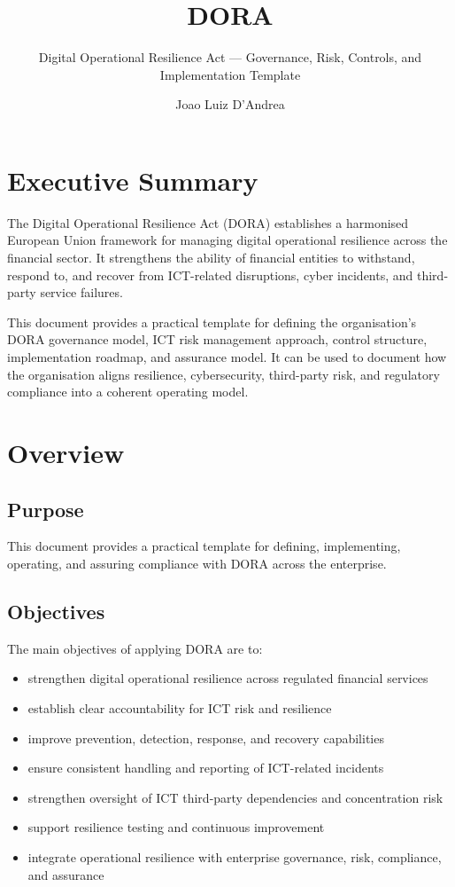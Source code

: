 \documentclass[
  letterpaper,
  DIV=11,
  numbers=noendperiod]{scrartcl}
\title{DORA}
\subtitle{Digital Operational Resilience Act --- Governance, Risk,
Controls, and Implementation Template}
\author{Joao Luiz D'Andrea}
\date{}
\providecommand{\tightlist}{%
  \setlength{\itemsep}{0pt}\setlength{\parskip}{0pt}}
\renewcommand*\contentsname{Table of contents}
\newcommand\contentsname{Table of contents}
\begin{document}
\maketitle

\renewcommand*\contentsname{Table of contents}
{
\hypersetup{linkcolor=}
\setcounter{tocdepth}{3}
\tableofcontents
}

\section{Executive Summary}\label{executive-summary}

The Digital Operational Resilience Act (DORA) establishes a harmonised
European Union framework for managing digital operational resilience
across the financial sector. It strengthens the ability of financial
entities to withstand, respond to, and recover from ICT-related
disruptions, cyber incidents, and third-party service failures.

This document provides a practical template for defining the
organisation's DORA governance model, ICT risk management approach,
control structure, implementation roadmap, and assurance model. It can
be used to document how the organisation aligns resilience,
cybersecurity, third-party risk, and regulatory compliance into a
coherent operating model.

\section{Overview}\label{overview}

\subsection{Purpose}\label{purpose}

This document provides a practical template for defining, implementing,
operating, and assuring compliance with DORA across the enterprise.

\subsection{Objectives}\label{objectives}

The main objectives of applying DORA are to:

\begin{itemize}
\tightlist
\item
  strengthen digital operational resilience across regulated financial
  services
\item
  establish clear accountability for ICT risk and resilience
\item
  improve prevention, detection, response, and recovery capabilities
\item
  ensure consistent handling and reporting of ICT-related incidents
\item
  strengthen oversight of ICT third-party dependencies and concentration
  risk
\item
  support resilience testing and continuous improvement
\item
  integrate operational resilience with enterprise governance, risk,
  compliance, and assurance
\end{itemize}
\end{document}
